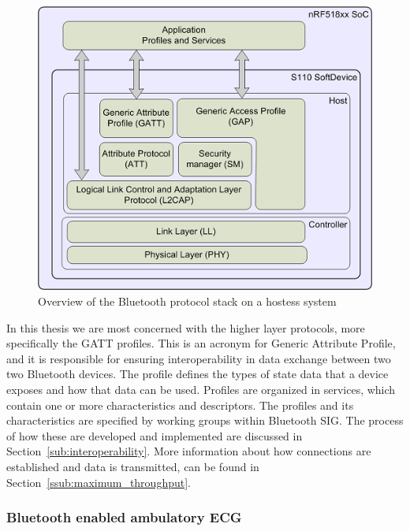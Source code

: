 \begin{figure}[H]
\centering
\includegraphics[scale=.8]{img/figures/bleNordicHost.png}
\caption{Overview of the Bluetooth protocol stack on a hostess system~\cite{nordicSDK}}
\label{fig:bleNordicHost}
\end{figure}



In this thesis we are most concerned with the higher layer protocols, more specifically the GATT profiles. This is an acronym for Generic Attribute Profile, and it is responsible for ensuring interoperability in data exchange between two two Bluetooth devices. The profile defines the types of state data that a device exposes and how that data can be used. Profiles are organized in services, which contain one or more characteristics and descriptors. The profiles and its characteristics are specified by working groups within Bluetooth SIG. The process of how these are developed and implemented are discussed in Section~\ref{sub:interoperability}. More information about how connections are established and data is transmitted, can be found in Section~\ref{ssub:maximum_throughput}.


\subsubsection{Bluetooth enabled ambulatory ECG} %
\label{ssub:bluetooth_enabled_ambulatory_ecg}

